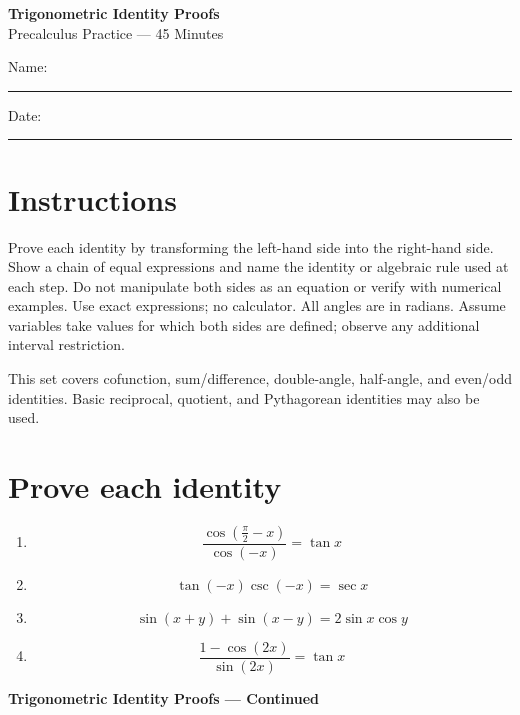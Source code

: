 \documentclass[12pt]{article}
\begin{document}
\begin{center}
  {\Large\textbf{Trigonometric Identity Proofs}}\\[3pt]
  {\large Precalculus Practice --- 45 Minutes}
\end{center}

Name: \rule{2.7in}{0.4pt}\hfill Date: \rule{1.5in}{0.4pt}

\section*{Instructions}
Prove each identity by transforming the left-hand side into the right-hand side.
Show a chain of equal expressions and name the identity or algebraic rule used
at each step. Do not manipulate both sides as an equation or verify with
numerical examples. Use exact expressions; no calculator. All angles are in
radians. Assume variables take values for which both sides are defined; observe
any additional interval restriction.

This set covers cofunction, sum/difference, double-angle, half-angle, and
even/odd identities. Basic reciprocal, quotient, and Pythagorean identities
may also be used.

\section*{Prove each identity}
\begin{enumerate}[leftmargin=*,itemsep=0pt]
  \item
  \[
    \frac{\cos\left(\frac{\pi}{2}-x\right)}{\cos(-x)}=\tan x
  \]

  \item
  \[
    \tan(-x)\csc(-x)=\sec x
  \]

  \item
  \[
    \sin(x+y)+\sin(x-y)=2\sin x\cos y
  \]

  \item
  \[
    \frac{1-\cos(2x)}{\sin(2x)}=\tan x
  \]
\end{enumerate}

\newpage
\begin{center}
  {\large\textbf{Trigonometric Identity Proofs --- Continued}}
\end{center}
\end{document}
